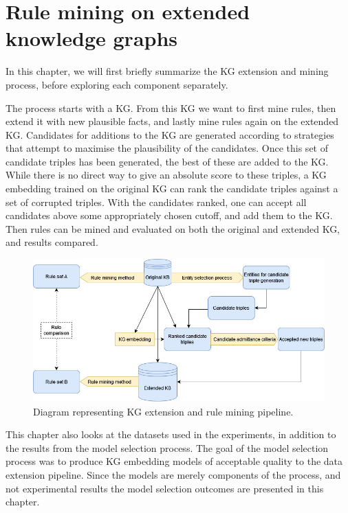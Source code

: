 \chapter{Rule mining on extended knowledge graphs}
In this chapter, we will first briefly summarize the KG extension and mining process, before exploring each component separately.

The process starts with a KG. From this KG we want to first mine rules, then extend it with new plausible facts, and lastly mine rules again on the extended KG. Candidates for additions to the KG are generated according to strategies that attempt to maximise the plausibility of the candidates. Once this set of candidate triples has been generated, the best of these are added to the KG. While there is no direct way to give an absolute score to these triples, a KG embedding trained on the original KG can rank the candidate triples against a set of corrupted triples. With the candidates ranked, one can accept all candidates above some appropriately chosen cutoff, and add them to the KG. Then rules can be mined and evaluated on both the original and extended KG, 
and results compared.

\begin{figure}[htp]
    \centering
    \includegraphics[width=16cm]{figures/ontology_mining_pipeline.jpg}
    \caption[Experiment pipeline diagram.]{Diagram representing KG extension and rule mining pipeline.}
\end{figure}

This chapter also looks at the datasets used in the experiments, in addition to the results from the model selection process. The goal of the model selection process was to produce KG embedding models of acceptable quality to the data extension pipeline. Since the models are merely components of the process, and not experimental results the model selection outcomes are presented in this chapter.

